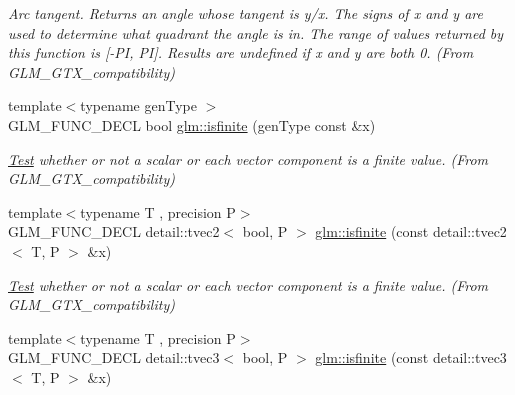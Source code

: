 \begin{DoxyCompactItemize}
\begin{DoxyCompactList}\small\item\em Arc tangent. Returns an angle whose tangent is y/x. The signs of x and y are used to determine what quadrant the angle is in. The range of values returned by this function is \mbox{[}-\/\+PI, PI\mbox{]}. Results are undefined if x and y are both 0. (From G\+L\+M\+\_\+\+G\+T\+X\+\_\+compatibility) \end{DoxyCompactList}\item 
{\footnotesize template$<$typename gen\+Type $>$ }\\G\+L\+M\+\_\+\+F\+U\+N\+C\+\_\+\+D\+E\+CL bool \hyperlink{group__gtx__compatibility_gaf4b04dcd3526996d68c1bfe17bfc8657}{glm\+::isfinite} (gen\+Type const \&x)\hypertarget{group__gtx__compatibility_gaf4b04dcd3526996d68c1bfe17bfc8657}{}\label{group__gtx__compatibility_gaf4b04dcd3526996d68c1bfe17bfc8657}

\begin{DoxyCompactList}\small\item\em \hyperlink{class_test}{Test} whether or not a scalar or each vector component is a finite value. (From G\+L\+M\+\_\+\+G\+T\+X\+\_\+compatibility) \end{DoxyCompactList}\item 
{\footnotesize template$<$typename T , precision P$>$ }\\G\+L\+M\+\_\+\+F\+U\+N\+C\+\_\+\+D\+E\+CL detail\+::tvec2$<$ bool, P $>$ \hyperlink{group__gtx__compatibility_ga604f38239da3a5b5b1e4fe06dec7f64d}{glm\+::isfinite} (const detail\+::tvec2$<$ T, P $>$ \&x)\hypertarget{group__gtx__compatibility_ga604f38239da3a5b5b1e4fe06dec7f64d}{}\label{group__gtx__compatibility_ga604f38239da3a5b5b1e4fe06dec7f64d}

\begin{DoxyCompactList}\small\item\em \hyperlink{class_test}{Test} whether or not a scalar or each vector component is a finite value. (From G\+L\+M\+\_\+\+G\+T\+X\+\_\+compatibility) \end{DoxyCompactList}\item 
{\footnotesize template$<$typename T , precision P$>$ }\\G\+L\+M\+\_\+\+F\+U\+N\+C\+\_\+\+D\+E\+CL detail\+::tvec3$<$ bool, P $>$ \hyperlink{group__gtx__compatibility_ga416b6078bffd22e3a56a5c5379ba2cf8}{glm\+::isfinite} (const detail\+::tvec3$<$ T, P $>$ \&x)\hypertarget{group__gtx__compatibility_ga416b6078bffd22e3a56a5c5379ba2cf8}{}\label{group__gtx__compatibility_ga416b6078bffd22e3a56a5c5379ba2cf8}


\end{DoxyCompactItemize}
